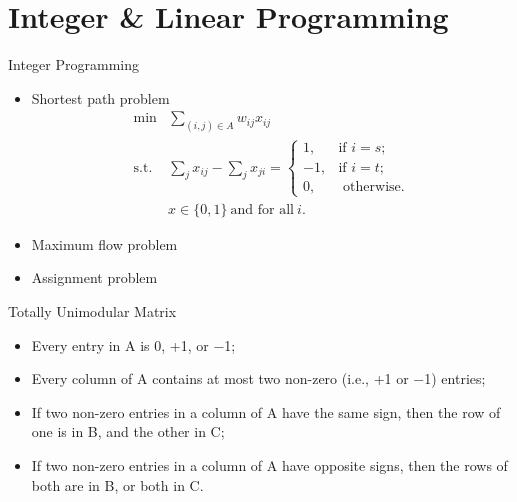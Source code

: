 \section{Integer \& Linear Programming}

    \frame{\sectionpage}

    \begin{frame}{Integer Programming}
        \begin{itemize}
          \item Shortest path problem
          \begin{equation*}
            \begin{align}
            \min& \sum_{(i,j)\in A}w_{ij}x_{ij}\\
            \text{s.t.} &\sum_{j}x_{ij}-\sum_{j}x_{ji}={\begin{cases}1,&{\text{if }}i=s;\\-1,&{\text{if }}i=t;\\0,&{\text{ otherwise.}}\end{cases}}\\
            & x\in \{0,1\} ~\text{and for all} ~i.
            \end{align}
          \end{equation*}
          \item Maximum flow problem
          \item Assignment problem
        \end{itemize}
    \end{frame}

    \begin{frame}{Totally Unimodular Matrix}
      \begin{itemize}
        \item Every entry in A is 0, +1, or −1;
        \item Every column of A contains at most two non-zero (i.e., +1 or −1) entries;
        \item If two non-zero entries in a column of A have the same sign, then the row of one is in B, and the other in C;
        \item If two non-zero entries in a column of A have opposite signs, then the rows of both are in B, or both in C.
      \end{itemize}
    \end{frame}

